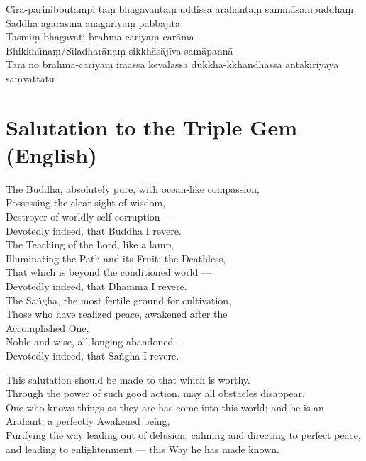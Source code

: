 Cira-parinibbutampi taṃ bhagavantaṃ uddissa arahantaṃ sammāsambuddhaṃ\\
Saddhā agārasmā anagāriyaṃ pabbajitā\\
Tasmiṃ bhagavati brahma-cariyaṃ carāma\\
Bhikkhūnaṃ/Sīladharānaṃ sikkhāsājīva-samāpannā\\
Taṃ no brahma-cariyaṃ imassa kevalassa dukkha-kkhandhassa antakiriyāya saṃvattatu

\enlargethispage{\baselineskip}

\section*{Salutation to the Triple Gem (English)}

\begin{leader}
\end{leader}

The Buddha, absolutely pure, with ocean-like compassion,\\
Possessing the clear sight of wisdom,\\
Destroyer of worldly self-corruption ---\\
Devotedly indeed, that Buddha I revere.\\
The Teaching of the Lord, like a lamp,\\
Illuminating the Path and its Fruit: the Deathless,\\
That which is beyond the conditioned world ---\\
Devotedly indeed, that Dhamma I revere.\\
The Saṅgha, the most fertile ground for cultivation,\\
Those who have realized peace, awakened after the \\Accomplished One,\\
Noble and wise, all longing abandoned ---\\
Devotedly indeed, that Saṅgha I revere.

This salutation should be made to that which is worthy.\\
Through the power of such good action, may all obstacles disappear.\\
One who knows things as they are has come into this world; and he is an Arahant, a perfectly Awakened being,\\
Purifying the way leading out of delusion, calming and directing to perfect peace, and leading to enlightenment --- this Way he has made known.

